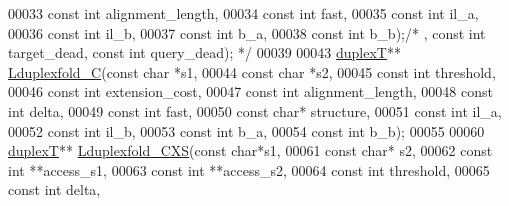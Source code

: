 \begin{DoxyCode}
00033                           \textcolor{keyword}{const} \textcolor{keywordtype}{int} alignment\_length,
00034                           \textcolor{keyword}{const} \textcolor{keywordtype}{int} fast,
00035                           \textcolor{keyword}{const} \textcolor{keywordtype}{int} il\_a,
00036                           \textcolor{keyword}{const} \textcolor{keywordtype}{int} il\_b,
00037                           \textcolor{keyword}{const} \textcolor{keywordtype}{int} b\_a,
00038                           \textcolor{keyword}{const} \textcolor{keywordtype}{int} b\_b);\textcolor{comment}{/* , const int target\_dead, const int query\_dead); */}
00039 
00043 \mbox{\hyperlink{group__data__structures_structduplex_t}{duplexT}}** \mbox{\hyperlink{plex_8h_a6eb39f7e41790fd3ab02adf8349a3b57}{Lduplexfold\_C}}(\textcolor{keyword}{const} \textcolor{keywordtype}{char} *s1,
00044                         \textcolor{keyword}{const} \textcolor{keywordtype}{char} *s2,
00045                         \textcolor{keyword}{const} \textcolor{keywordtype}{int} threshold,
00046                         \textcolor{keyword}{const} \textcolor{keywordtype}{int} extension\_cost,
00047                         \textcolor{keyword}{const} \textcolor{keywordtype}{int} alignment\_length,
00048                         \textcolor{keyword}{const} \textcolor{keywordtype}{int} delta,
00049                         \textcolor{keyword}{const} \textcolor{keywordtype}{int} fast,
00050                         \textcolor{keyword}{const} \textcolor{keywordtype}{char}* structure,
00051                         \textcolor{keyword}{const} \textcolor{keywordtype}{int} il\_a,
00052                         \textcolor{keyword}{const} \textcolor{keywordtype}{int} il\_b,
00053                         \textcolor{keyword}{const} \textcolor{keywordtype}{int} b\_a,
00054                         \textcolor{keyword}{const} \textcolor{keywordtype}{int} b\_b);
00055 
00060 \mbox{\hyperlink{group__data__structures_structduplex_t}{duplexT}}** \mbox{\hyperlink{plex_8h_a7ec64ec26e9fbfd7bdd53c978c089829}{Lduplexfold\_CXS}}(\textcolor{keyword}{const} \textcolor{keywordtype}{char}*s1,
00061                           \textcolor{keyword}{const} \textcolor{keywordtype}{char}* s2,
00062                           \textcolor{keyword}{const} \textcolor{keywordtype}{int} **access\_s1,
00063                           \textcolor{keyword}{const} \textcolor{keywordtype}{int} **access\_s2,
00064                           \textcolor{keyword}{const} \textcolor{keywordtype}{int} threshold,
00065                           \textcolor{keyword}{const} \textcolor{keywordtype}{int} delta,

\end{DoxyCode}
